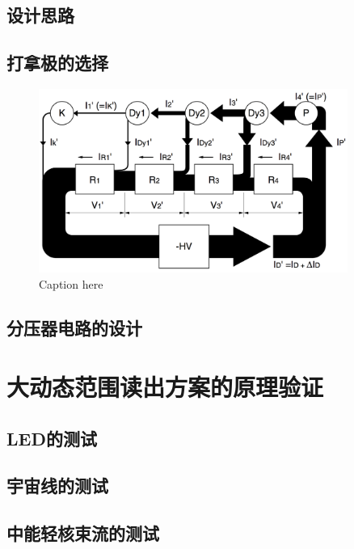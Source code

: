 \subsection{设计思路}
\label{sec:dynamic_range:readout_scheme}

\subsection{打拿极的选择}
\label{sec:dynamic_range:dynode_selection}

\begin{figure}[tb]
	\centering
	\includegraphics[width=0.9\textwidth]{chap/dynamic_range/fig/pmt_current_distribution_hamamatsu}
	\caption{Caption here}
	\label{fig:figure1}
\end{figure}

\subsection{分压器电路的设计}
\label{sec:dynamic_range:hv_divider}

\section{大动态范围读出方案的原理验证}
\label{sec:dynamic_range:verification}

\subsection{LED的测试}
\label{sec:dynamic_range:led}

\subsection{宇宙线的测试}
\label{sec:dynamic_range:cosmic_ray}

\subsection{中能轻核束流的测试}
\label{sec:dynamic_range:ion_beam}
